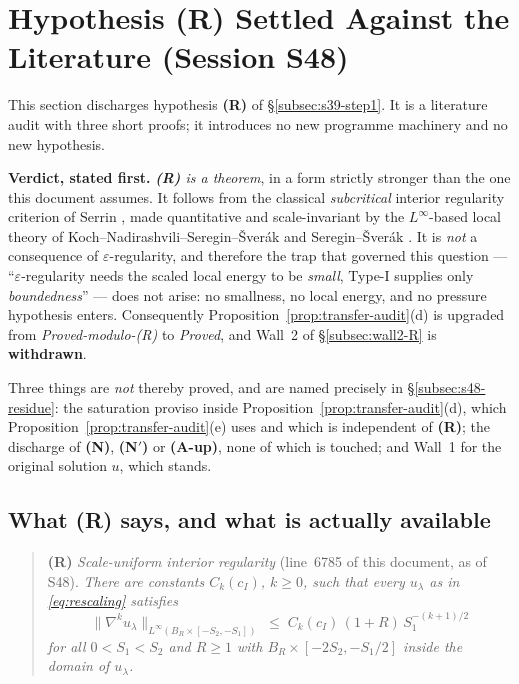 \documentclass[11pt]{article}
\theoremstyle{definition}
\theoremstyle{remark}
\begin{document}
\section{Hypothesis (R) Settled Against the Literature (Session S48)}
\label{sec:hypR-s48}

This section discharges hypothesis \textbf{(R)} of \S\ref{subsec:s39-step1}.
It is a literature audit with three short proofs; it introduces no new
programme machinery and no new hypothesis.

\medskip
\noindent\textbf{Verdict, stated first.}
\emph{\textbf{(R)} is a theorem}, in a form strictly stronger than the one
this document assumes. It follows from the classical \emph{subcritical}
interior regularity criterion of Serrin \cite{Serrin1962}, made quantitative
and scale-invariant by the $L^\infty$-based local theory of
Koch--Nadirashvili--Seregin--\v{S}ver\'ak \cite{KNSS2009} and
Seregin--\v{S}ver\'ak \cite{SereginSverak2009}. It is \emph{not} a consequence
of $\varepsilon$-regularity, and therefore the trap that governed this
question --- ``$\varepsilon$-regularity needs the scaled local energy to be
\emph{small}, Type-I supplies only \emph{boundedness}'' --- does not arise:
no smallness, no local energy, and no pressure hypothesis enters. Consequently
Proposition~\ref{prop:transfer-audit}(d) is upgraded from
\emph{Proved-modulo-(R)} to \emph{Proved}, and Wall~2 of
\S\ref{subsec:wall2-R} is \textbf{withdrawn}.

Three things are \emph{not} thereby proved, and are named precisely in
\S\ref{subsec:s48-residue}: the saturation proviso inside
Proposition~\ref{prop:transfer-audit}(d), which
Proposition~\ref{prop:transfer-audit}(e) uses and which is independent of
\textbf{(R)}; the discharge of \textbf{(N)}, \textbf{(N$'$)} or
\textbf{(A-up)}, none of which is touched; and Wall~1 for the original
solution $u$, which stands.

\subsection{What (R) says, and what is actually available}
\label{subsec:s48-what-R-says}

\begin{quote}
\textbf{(R)} \emph{Scale-uniform interior regularity} (line~6785 of this
document, as of S48). \emph{There are constants $C_k(c_I)$, $k\geq0$, such
that every $u_\lambda$ as in \eqref{eq:rescaling} satisfies}
\[
  \bigl\|\nabla^k u_\lambda\bigr\|_{L^\infty(B_R\times[-S_2,-S_1])}
  \;\leq\; C_k(c_I)\,(1+R)\,S_1^{-(k+1)/2}
\]
\emph{for all $0<S_1<S_2$ and $R\geq1$ with $B_R\times[-2S_2,-S_1/2]$ inside
the domain of $u_\lambda$.}
\end{quote}
\end{document}
